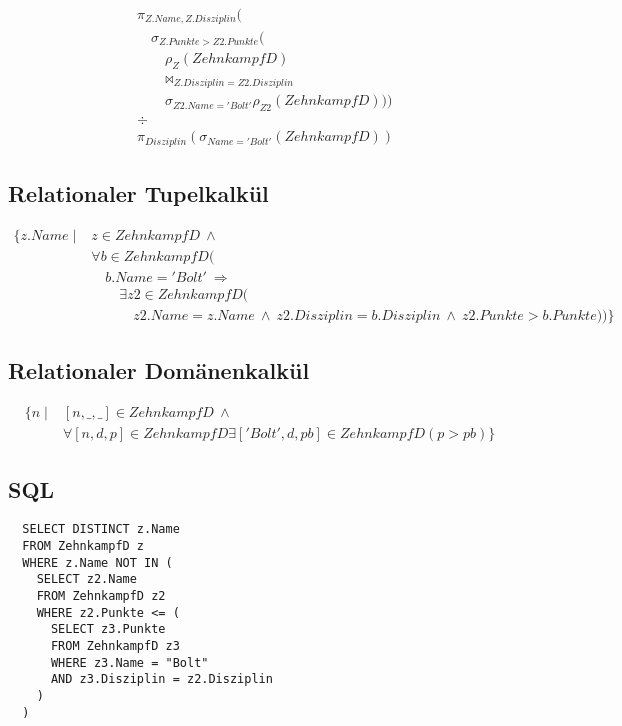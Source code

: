 \documentclass[10pt,a4paper]{article}
\begin{document}
\begin{align*}
  & \pi_{Z.Name, Z.Disziplin}(\\
  & \quad \sigma_{Z.Punkte > Z2.Punkte}(\\
  & \quad \quad \rho_{Z}(ZehnkampfD)\\
  & \quad \quad \bowtie_{Z.Disziplin = Z2.Disziplin}\\
  & \quad \quad \sigma_{Z2.Name = 'Bolt'}\rho_{Z2}(ZehnkampfD)))\\
  & \div\\
  & \pi_{Disziplin}(\sigma_{Name = 'Bolt'}(ZehnkampfD))
\end{align*}

\subsection*{Relationaler Tupelkalkül}

\begin{align*}
  \{ z.Name \mid & z \in ZehnkampfD\ \land\\
                 & \forall b \in ZehnkampfD(\\
                 & \quad b.Name = 'Bolt'\ \Rightarrow\\
                 & \quad \quad \exists z2 \in ZehnkampfD (\\
                 & \quad \quad \quad z2.Name = z.Name\ \land\ z2.Disziplin = b.Disziplin\ \land\ z2.Punkte > b.Punkte)) \}
\end{align*}

\subsection*{Relationaler Domänenkalkül}

\begin{align*}
  \{ n \mid & [n, \_, \_] \in ZehnkampfD\ \land\\
            & \forall [n, d, p] \in ZehnkampfD \exists ['Bolt', d, pb] \in ZehnkampfD (p > pb) \}
\end{align*}

\subsection*{SQL}

\begin{verbatim}
  SELECT DISTINCT z.Name
  FROM ZehnkampfD z
  WHERE z.Name NOT IN (
    SELECT z2.Name
    FROM ZehnkampfD z2
    WHERE z2.Punkte <= (
      SELECT z3.Punkte
      FROM ZehnkampfD z3
      WHERE z3.Name = "Bolt"
      AND z3.Disziplin = z2.Disziplin
    )
  )
\end{verbatim}
\end{document}
